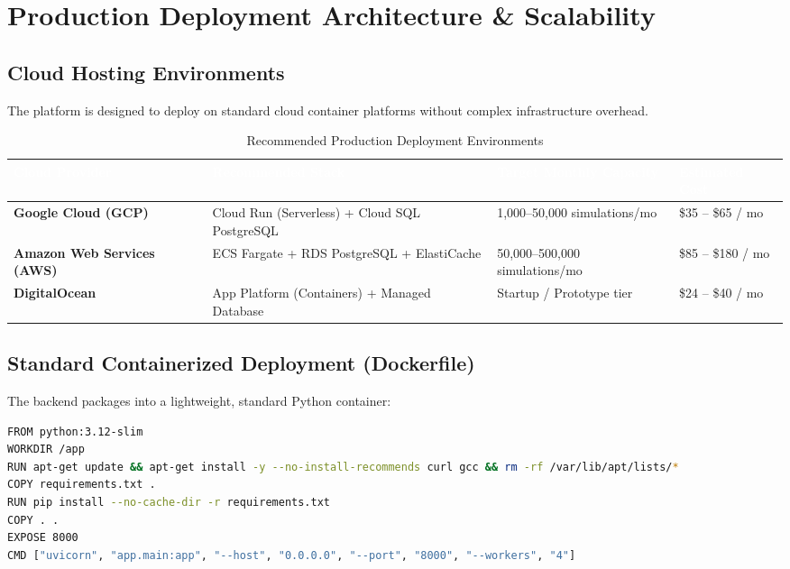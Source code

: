 \documentclass[11pt,a4paper]{article}
\begin{document}
\newpage
\section{Production Deployment Architecture \& Scalability}

\subsection{Cloud Hosting Environments}
The platform is designed to deploy on standard cloud container platforms without complex infrastructure overhead.

\begin{table}[htbp]
\centering
\small
\setlength{\aboverulesep}{0pt}
\setlength{\belowrulesep}{0pt}
\setlength{\tabcolsep}{5pt}
\renewcommand{\arraystretch}{1.25}
\begin{tabularx}{\textwidth}{lXll}
\toprule
\rowcolor{tblheaderblue}
\textcolor{white}{\textbf{Cloud Provider}} & \textcolor{white}{\textbf{Recommended Stack}} & \textcolor{white}{\textbf{Target Monthly Capacity}} & \textcolor{white}{\textbf{Estimated Cost}} \\
\midrule
\textbf{Google Cloud (GCP)} & Cloud Run (Serverless) + Cloud SQL PostgreSQL & 1,000--50,000 simulations/mo & \$35 -- \$65 / mo \\
\textbf{Amazon Web Services (AWS)} & ECS Fargate + RDS PostgreSQL + ElastiCache & 50,000--500,000 simulations/mo & \$85 -- \$180 / mo \\
\textbf{DigitalOcean} & App Platform (Containers) + Managed Database & Startup / Prototype tier & \$24 -- \$40 / mo \\
\bottomrule
\end{tabularx}
\caption{Recommended Production Deployment Environments}
\end{table}

\subsection{Standard Containerized Deployment (Dockerfile)}
The backend packages into a lightweight, standard Python container:

\begin{lstlisting}[language=bash,caption={Production Dockerfile Specification}]
FROM python:3.12-slim
WORKDIR /app
RUN apt-get update && apt-get install -y --no-install-recommends curl gcc && rm -rf /var/lib/apt/lists/*
COPY requirements.txt .
RUN pip install --no-cache-dir -r requirements.txt
COPY . .
EXPOSE 8000
CMD ["uvicorn", "app.main:app", "--host", "0.0.0.0", "--port", "8000", "--workers", "4"]
\end{lstlisting}
\end{document}
